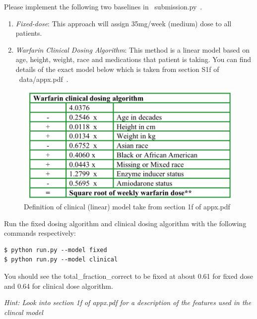 \item {}

Please implement the following two baselines in ~submission.py~.
\begin{enumerate}
    \item \textit{Fixed-dose}: This approach will assign 35mg/week (medium) dose to all patients.
    \item \textit{Warfarin Clinical Dosing Algorithm}: This method is a linear model based on age, height, weight, race and medications that patient is taking. You can find details of the exact model below which is taken from section S1f of ~data/appx.pdf~.
\end{enumerate}

\begin{figure}[H]
\centering
  \includegraphics[width=.5\linewidth]{images/clinical_model.png}
  \caption{Definition of clinical (linear) model take from section 1f of appx.pdf}
\end{figure}

Run the fixed dosing algorithm and clinical dosing algorithm with the following commands respectively:

\begin{lstlisting}
$ python run.py --model fixed
$ python run.py --model clinical
\end{lstlisting}

You should see the total\_fraction\_correct to be fixed at about 0.61 for fixed dose and 0.64 for clinical dose algorithm.

\textit{Hint: Look into section 1f of appx.pdf for a description of the features used in the clincal model}
